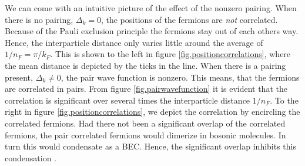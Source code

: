 We can come with an intuitive picture of the effect of the nonzero pairing. When there is no pairing, $\Delta_k = 0$, the positions of the fermions are \textit{not} correlated. Because of the Pauli exclusion principle the fermions stay out of each others way. Hence, the interparticle distance only varies little around the average of $1/n_F = \pi / k_F$. This is shown to the left in figure \ref{fig.positioncorrelations}, where the mean distance is depicted by the ticks in the line. When there is a pairing present, $\Delta_k \neq 0$, the pair wave function is nonzero. This means, that the fermions are correlated in pairs. From figure \ref{fig.pairwavefunction} it is evident that the correlation is significant over several times the interparticle distance $1 / n_F$. To the right in figure \ref{fig.positioncorrelations}, we depict the correlation by encircling the correlated fermions. Had there not been a significant overlap of the correlated fermions, the pair correlated fermions would dimerize in bosonic molecules. In turn this would condensate as a BEC. Hence, the significant overlap inhibits this condensation \cite{TaylorBCStoBEC}.  

